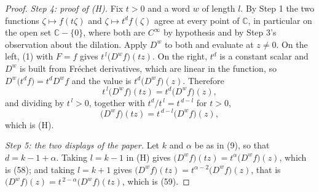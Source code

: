 \begin{proof}
\emph{Step 4: proof of (H).}  Fix $t>0$ and a word $w$ of length $l$.  By
Step 1 the two functions $\zeta\mapsto f(t\zeta)$ and
$\zeta\mapsto t^{d}f(\zeta)$ agree at every point of $\mathbb{C}$, in
particular on the open set $\mathbb{C}-\{0\}$, where both are $C^\infty$ by
hypothesis and by Step 3's observation about the dilation.  Apply $D^{w}$ to
both and evaluate at $z\neq0$.  On the left, (1) with $F=f$ gives
$t^{\,l}\bigl(D^{w}f\bigr)(tz)$.  On the right, $t^{d}$ is a constant scalar
and $D^{w}$ is built from Fréchet derivatives, which are linear in the
function, so $D^{w}\bigl(t^{d}f\bigr)=t^{d}D^{w}f$ and the value is
$t^{d}\bigl(D^{w}f\bigr)(z)$.  Therefore
\[
  t^{\,l}\bigl(D^{w}f\bigr)(tz)=t^{d}\bigl(D^{w}f\bigr)(z),
\]
and dividing by $t^{\,l}>0$, together with $t^{d}/t^{\,l}=t^{\,d-l}$ for
$t>0$,
\[
  \bigl(D^{w}f\bigr)(tz)=t^{\,d-l}\bigl(D^{w}f\bigr)(z),
\]
which is (H).

\emph{Step 5: the two displays of the paper.}  Let $k$ and $\alpha$ be as in
(9), so that $d=k-1+\alpha$.  Taking $l=k-1$ in (H) gives
$\bigl(D^{w}f\bigr)(tz)=t^{\alpha}\bigl(D^{w}f\bigr)(z)$, which is (58); and
taking $l=k+1$ gives
$\bigl(D^{w}f\bigr)(tz)=t^{\alpha-2}\bigl(D^{w}f\bigr)(z)$, that is
$\bigl(D^{w}f\bigr)(z)=t^{\,2-\alpha}\bigl(D^{w}f\bigr)(tz)$, which is (59).
\end{proof}
